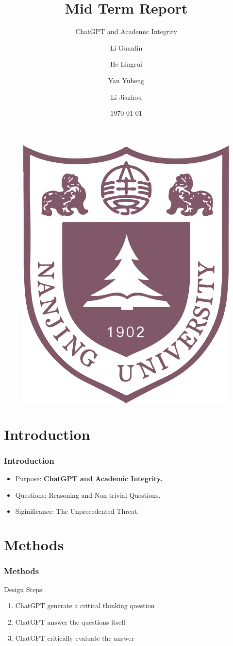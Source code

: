 \documentclass{beamer}
\title[Reflection on ChatGPT]
{Mid Term Report}
\subtitle{ChatGPT and Academic Integrity}
\author[Eric] %
{Li Guanlin\inst{1} \and He Lingrui\inst{1} \and Yan Yuheng \inst{1} \and Li Jiazhou \inst{1}}
\institute[NJU] %
{
\inst{1}%
Undergraduates in ICS\\
Nanjing University
\and
}
\date[NJU 2023] %
{\today}
\begin{document}
\begin{frame}
    \titlepage
    \begin{figure}[htpb]
        \begin{center}
            \includegraphics[width=0.2\linewidth]{pic/NJU_Logo.eps}
        \end{center}
    \end{figure}
\end{frame}

\begin{frame}
    \tableofcontents[sectionstyle=show,subsectionstyle=show/shaded/hide,subsubsectionstyle=show/shaded/hide]
\end{frame}

\section{Introduction}

\begin{frame}
    \frametitle{Introduction}
    \Large
    \begin{itemize}
        \item Purpose: \textbf{ChatGPT and Academic Integrity.}
        \item Questions: Reasoning and Non-trivial Questions.
        \item Siginificance: \alert{The Unprecedented Threat.}%
    \end{itemize}
\end{frame}

\section{Methods}

\begin{frame}
    \frametitle{Methods}
    \Large
    \begin{block}{Design}
        Steps:

        \begin{enumerate}
            \item<1-> ChatGPT generate a critical thinking question
            \item<2-> ChatGPT answer the questions itself
            \item<3-> ChatGPT critically evaluate the answer
        \end{enumerate}
    \end{block}
\end{frame}
\end{document}
